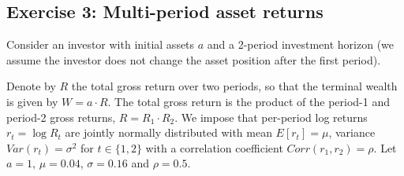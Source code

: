 \documentclass[10pt]{scrartcl}
\begin{document}
    \hypertarget{exercise-3-multi-period-asset-returns}{%
\subsection{Exercise 3: Multi-period asset
returns}\label{exercise-3-multi-period-asset-returns}}

Consider an investor with initial assets \(a\) and a 2-period investment
horizon (we assume the investor does not change the asset position after
the first period).

Denote by \(R\) the total gross return over two periods, so that the
terminal wealth is given by \(W = a\cdot R\). The total gross return is
the product of the period-1 and period-2 gross returns,
\(R = R_1\cdot R_2\). We impose that per-period log returns
\(r_t = \log R_t\) are jointly normally distributed with mean
\(E[r_t] = \mu\), variance \(Var(r_t) = \sigma^2\) for \(t\in\{1,2\}\)
with a correlation coefficient \(Corr(r_1,r_2) = \rho\). Let \(a = 1\),
\(\mu = 0.04\), \(\sigma = 0.16\) and \(\rho = 0.5\).
\end{document}

